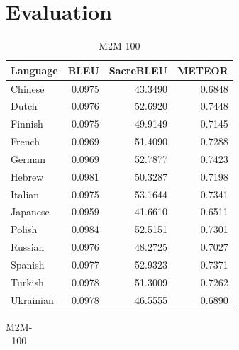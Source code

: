 \documentclass[a4paper]{article}
\begin{document}
\section{Evaluation}


\begin{table}[htbp]
    \centering
    \begin{minipage}{0.49\linewidth}
        \footnotesize
        \begin{tabular}{|l|r|r|r|}
            \hline
            \textbf{Language} & \textbf{BLEU} & \textbf{SacreBLEU} & \textbf{METEOR} \\
            \hline
            Chinese           & 0.0975        & 43.3490            & 0.6848          \\
            Dutch             & 0.0976        & 52.6920            & 0.7448          \\
            Finnish           & 0.0975        & 49.9149            & 0.7145          \\
            French            & 0.0969        & 51.4090            & 0.7288          \\
            German            & 0.0969        & 52.7877            & 0.7423          \\
            Hebrew            & 0.0981        & 50.3287            & 0.7198          \\
            Italian           & 0.0975        & 53.1644            & 0.7341          \\
            Japanese          & 0.0959        & 41.6610            & 0.6511          \\
            Polish            & 0.0984        & 52.5151            & 0.7301          \\
            Russian           & 0.0976        & 48.2725            & 0.7027          \\
            Spanish           & 0.0977        & 52.9323            & 0.7371          \\
            Turkish           & 0.0978        & 51.3009            & 0.7262          \\
            Ukrainian         & 0.0978        & 46.5555            & 0.6890          \\
            \hline
        \end{tabular}
        \caption{M2M-100}
    \end{minipage}
    \begin{minipage}{0.49\linewidth}
        \footnotesize
        \begin{tabular}{|l|r|r|r|}

\end{tabular}
\end{minipage}
\end{table}
\end{document}
